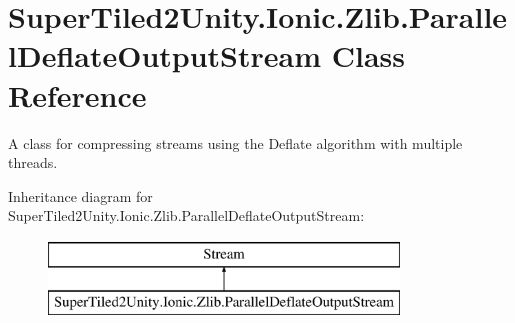 \hypertarget{class_super_tiled2_unity_1_1_ionic_1_1_zlib_1_1_parallel_deflate_output_stream}{}\section{Super\+Tiled2\+Unity.\+Ionic.\+Zlib.\+Parallel\+Deflate\+Output\+Stream Class Reference}
\label{class_super_tiled2_unity_1_1_ionic_1_1_zlib_1_1_parallel_deflate_output_stream}


A class for compressing streams using the Deflate algorithm with multiple threads.  


Inheritance diagram for Super\+Tiled2\+Unity.\+Ionic.\+Zlib.\+Parallel\+Deflate\+Output\+Stream\+:\begin{figure}[H]
\begin{center}
\leavevmode
\includegraphics[height=2.000000cm]{class_super_tiled2_unity_1_1_ionic_1_1_zlib_1_1_parallel_deflate_output_stream}
\end{center}
\end{figure}
